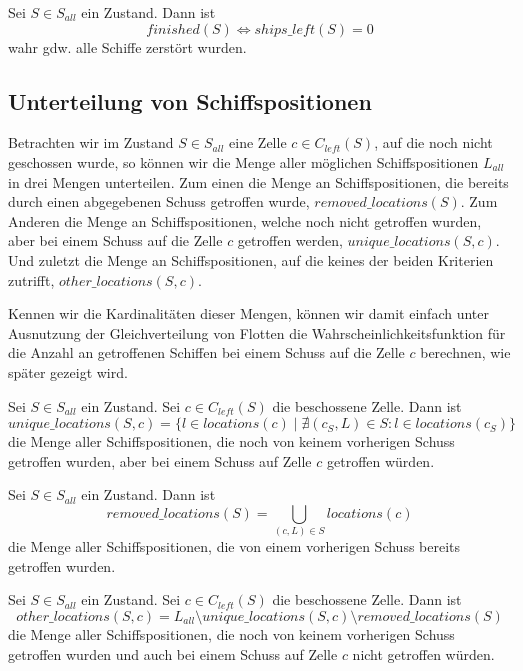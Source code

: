 \documentclass[a4paper,12pt]{llncs}
\numberwithin{equation}{section}
\begin{document}
\begin{definition}
Sei $S\in S_{all}$ ein Zustand.
Dann ist
\[
finished(S) \Leftrightarrow ships\_left(S)=0
\]
wahr gdw. alle Schiffe zerstört wurden.
\end{definition}

\subsection{Unterteilung von Schiffspositionen}

Betrachten wir im Zustand $S\in S_{all}$ eine Zelle $c \in C_{left}(S)$, auf die noch nicht geschossen wurde, so können wir die Menge aller möglichen Schiffspositionen $L_{all}$ in drei Mengen unterteilen. Zum einen die Menge an Schiffspositionen, die bereits durch einen abgegebenen Schuss getroffen wurde, $removed\_locations(S)$. Zum Anderen die Menge an Schiffspositionen, welche noch nicht getroffen wurden, aber bei einem Schuss auf die Zelle $c$ getroffen werden, $unique\_locations(S, c)$. Und zuletzt die Menge an Schiffspositionen, auf die keines der beiden Kriterien zutrifft, $other\_locations(S, c)$.

Kennen wir die Kardinalitäten dieser Mengen, können wir damit einfach unter Ausnutzung der Gleichverteilung von Flotten die Wahrscheinlichkeitsfunktion für die Anzahl an getroffenen Schiffen bei einem Schuss auf die Zelle $c$ berechnen, wie später gezeigt wird.

\begin{definition}
Sei $S\in S_{all}$ ein Zustand.
Sei $c \in C_{left}(S)$ die beschossene Zelle.
Dann ist
\[
unique\_locations(S, c)=\{l \in locations(c) \mid \nexists (c_S,L) \in S \colon l \in locations(c_S)\}
\]
die Menge aller Schiffspositionen, die noch von keinem vorherigen Schuss getroffen wurden, aber bei einem Schuss auf Zelle $c$ getroffen würden.
\end{definition}

\begin{definition}
Sei $S\in S_{all}$ ein Zustand.
Dann ist
\[
removed\_locations(S)=\bigcup_{(c,L) \in S} locations(c)
\]
die Menge aller Schiffspositionen, die von einem vorherigen Schuss bereits getroffen wurden.
\end{definition}

\begin{definition}
Sei $S\in S_{all}$ ein Zustand.
Sei $c \in C_{left}(S)$ die beschossene Zelle.
Dann ist
\[
other\_locations(S, c)=L_{all} \setminus unique\_locations(S, c) \setminus removed\_locations(S)
\]
die Menge aller Schiffspositionen, die noch von keinem vorherigen Schuss getroffen wurden und auch bei einem Schuss auf Zelle $c$ nicht getroffen würden.
\end{definition}
\end{document}
